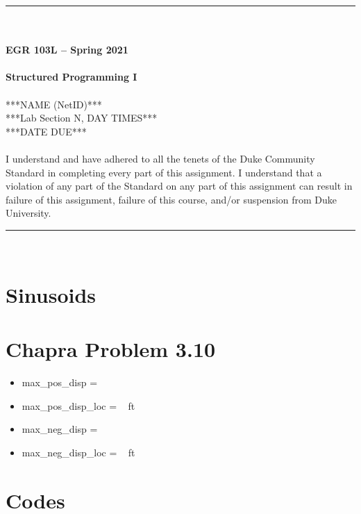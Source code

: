 \documentclass{article}
\begin{document}
\begin{center}
\rule{6.5in}{0.5mm}\\~\\
\textbf{\large EGR 103L -- Spring 2021}\\~\\
\textbf{\huge Structured Programming I}\\~\\
***NAME (NetID)***\\
***Lab Section N, DAY TIMES***\\
***DATE DUE***\\~\\
{\small I understand and have adhered to all the tenets of the Duke
  Community Standard in completing every part of this assignment.  I
  understand that a violation of any part of the Standard on any part
  of this assignment can result in failure of this assignment, failure
  of this course, and/or suspension from Duke University.} 
\rule{6.5in}{0.5mm}\\
\end{center}
\tableofcontents
\listoffigures
\pagebreak

\section{Sinusoids}

\section{Chapra Problem 3.10}
\begin{itemize}
\item max\_pos\_disp = ~
\item max\_pos\_disp\_loc = ~ ft
\item max\_neg\_disp = ~
\item max\_neg\_disp\_loc = ~ ft
\end{itemize}

\pagebreak
\appendix
\section{Codes}


\end{document}
